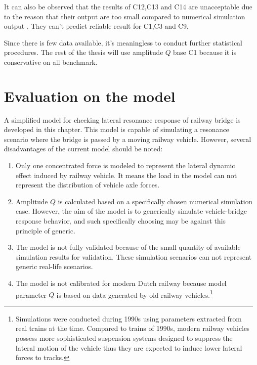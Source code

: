 It can also be observed that the results of C12,C13 and C14 are unacceptable due to the reason that their output are too small compared to numerical simulation output . They can't predict reliable result for C1,C3 and C9.

Since there is few data available, it's meaningless to conduct further statistical procedures. The rest of the thesis will use amplitude $Q$ base C1 because it is conservative on all benchmark. 

\section{Evaluation on the model}
A simplified model for checking lateral resonance response of railway bridge is developed in this chapter. This model is capable of simulating a resonance scenario where the bridge is passed by a moving railway vehicle. However, several disadvantages of the current model should be noted:

\begin{enumerate}
	\item Only one concentrated force is modeled to represent the lateral dynamic effect induced by railway vehicle. It means the load in the model can not represent the distribution of vehicle axle forces. 
	\item Amplitude $Q$ is calculated based on a specifically chosen numerical simulation case. However, the aim of the model is to generically simulate vehicle-bridge response behavior, and such specifically choosing may be against this principle of generic.  
	\item The model is not fully validated because of the small quantity of available simulation results for validation. These simulation scenarios can not represent generic real-life scenarios.
	\item The model is not calibrated for modern Dutch railway because model parameter $Q$ is based on data generated by old railway vehicles.\footnote{Simulations\citep{d181dt329} were conducted during 1990s using parameters extracted from real trains at the time. Compared to trains of 1990s, modern railway vehicles possess more sophisticated suspension systems designed to suppress the lateral motion of the vehicle thus they are expected to induce lower lateral forces to tracks.} 
\end{enumerate}